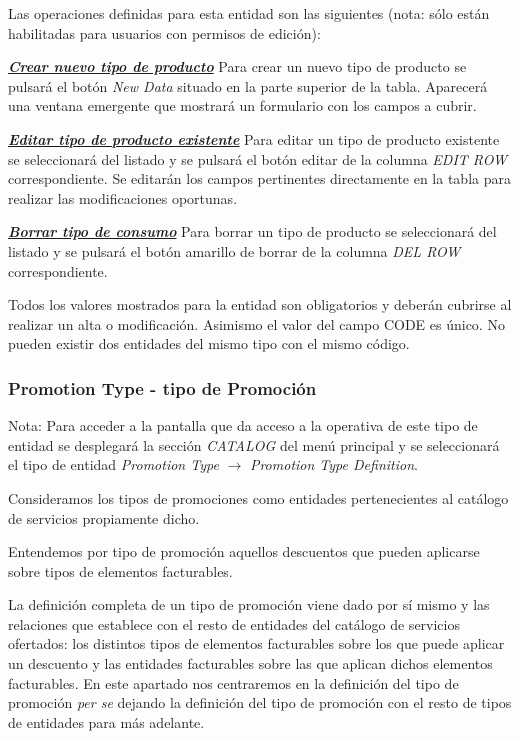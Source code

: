 Las operaciones definidas para esta entidad son las siguientes (nota: sólo están habilitadas para usuarios con permisos de edición):

\underline{\textsl{\textbf{Crear nuevo tipo de producto}}}\newline
Para crear un nuevo tipo de producto se pulsará el botón \textit{New Data} situado en la parte superior de la tabla. Aparecerá una ventana emergente que mostrará un formulario con los campos a cubrir.

\underline{\textsl{\textbf{Editar tipo de producto existente}}}\newline
Para editar un tipo de producto existente se seleccionará del listado y se pulsará el botón editar de la columna \textit{EDIT ROW} correspondiente. Se editarán los campos pertinentes directamente en la tabla para realizar las modificaciones oportunas. 

\underline{\textsl{\textbf{Borrar tipo de consumo}}}\newline
Para borrar un tipo de producto se seleccionará del listado y se pulsará el botón amarillo de borrar de la columna \textit{DEL ROW} correspondiente.\newline

Todos los valores mostrados para la entidad son obligatorios y deberán cubrirse al realizar un alta o modificación. Asimismo el valor del campo CODE es único. No pueden existir dos entidades del mismo tipo con el mismo código.



\subsubsection{Promotion Type - tipo de Promoción}
\label{sub:promotion-type}

Nota: Para acceder a la pantalla que da acceso a la operativa de este tipo de entidad se desplegará la sección \emph{CATALOG} del menú principal y se seleccionará el tipo de entidad \emph{Promotion Type} $\rightarrow$  \emph{Promotion Type Definition}.

Consideramos los tipos de promociones como entidades pertenecientes al catálogo de servicios propiamente dicho.

Entendemos por tipo de promoción aquellos descuentos que pueden aplicarse sobre tipos de elementos facturables.

La definición completa de un tipo de promoción viene dado por sí mismo y las relaciones que establece con el resto de entidades del catálogo de servicios ofertados: los distintos tipos de elementos facturables sobre los que puede aplicar un descuento y las entidades facturables sobre las que aplican dichos elementos facturables.  En este apartado nos centraremos en la definición del tipo de promoción \textit{per se} dejando la definición del tipo de promoción con el resto de tipos de entidades para más adelante.

